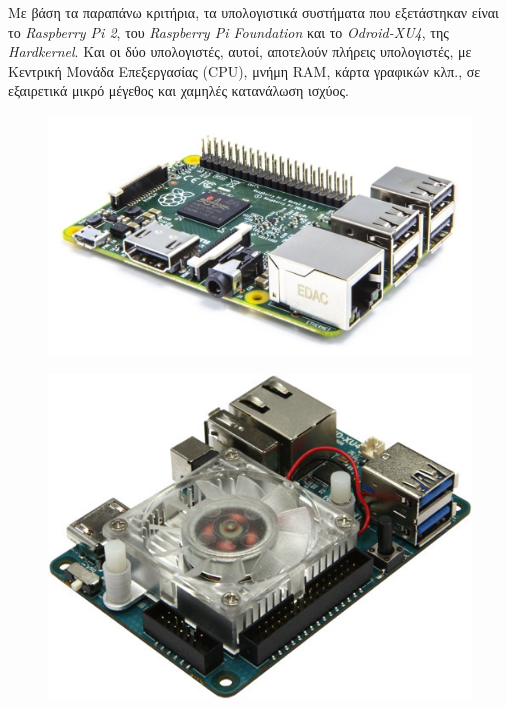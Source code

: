 \bigskip
Με βάση τα παραπάνω κριτήρια, τα υπολογιστικά συστήματα που εξετάστηκαν είναι το \textit{Raspberry Pi 2}, του \textit{Raspberry Pi Foundation} και το \textit{Odroid-XU4}, της \textit{Hardkernel}. Και οι δύο υπολογιστές, αυτοί, αποτελούν πλήρεις υπολογιστές, με Κεντρική Μονάδα Επεξεργασίας (CPU), μνήμη RAM, κάρτα γραφικών κλπ., σε εξαιρετικά μικρό μέγεθος και χαμηλές κατανάλωση ισχύος.

\begin{figure}[!ht]
	\begin{minipage}[t]{.49\textwidth}
 		\centering
		\includegraphics[width=0.6\linewidth]{Chapters/Chapter2/Figures/rpi2.jpg}
		\label{fig:rpi2}
	\end{minipage}
	\begin{minipage}[t]{.5\textwidth}		
		\centering
		\includegraphics[width=0.5\linewidth]{Chapters/Chapter2/Figures/odroid-xu4.jpg}
		\label{fig:odroid-xu4}
	\end{minipage}
\end{figure}

